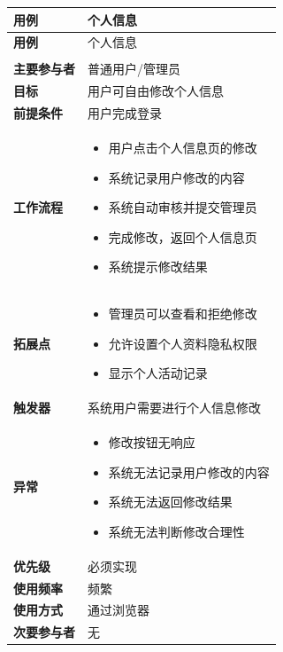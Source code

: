 \documentclass[12pt,a4paper,UTF8]{article}
\begin{document}
\begin{xltabular}{\linewidth}{|>{\raggedright\arraybackslash}p{3cm}|>{\raggedright\arraybackslash}p{8cm}|}
  \hline
  \textbf{用例} & 个人信息 \\ \hline \endfirsthead
  \hline
  \textbf{用例} & 个人信息 \\ \hline \endhead
  \hline
   \\ \endfoot
  \hline \endlastfoot

  \textbf{主要参与者} & 普通用户/管理员 \\ \hline
  \textbf{目标} & 用户可自由修改个人信息 \\ \hline
  \textbf{前提条件} & 用户完成登录 \\ \hline
  \textbf{工作流程} & 
  \vspace{-0.5em}
  \begin{itemize}[topsep=0pt, partopsep=0pt, left=0pt, nosep]
      \item 用户点击个人信息页的修改
      \item 系统记录用户修改的内容
      \item 系统自动审核并提交管理员
      \item 完成修改，返回个人信息页
      \item 系统提示修改结果
  \end{itemize} \\ \hline
  \textbf{拓展点} &
  \vspace{-0.5em}
  \begin{itemize}[topsep=0pt, partopsep=0pt, left=0pt, nosep]
      \item 管理员可以查看和拒绝修改
      \item 允许设置个人资料隐私权限
      \item 显示个人活动记录
  \end{itemize} \\ \hline
  \textbf{触发器} & 系统用户需要进行个人信息修改 \\ \hline
  \textbf{异常} & 
  \vspace{-0.5em}
  \begin{itemize}[topsep=0pt, partopsep=0pt, left=0pt, nosep]
      \item 修改按钮无响应
      \item 系统无法记录用户修改的内容
      \item 系统无法返回修改结果
      \item 系统无法判断修改合理性
  \end{itemize} \\ \hline
  \textbf{优先级} & 必须实现 \\ \hline
  \textbf{使用频率} & 频繁 \\ \hline
  \textbf{使用方式} & 通过浏览器 \\ \hline
  \textbf{次要参与者} & 无 \\ \hline
\end{xltabular}
\end{document}

